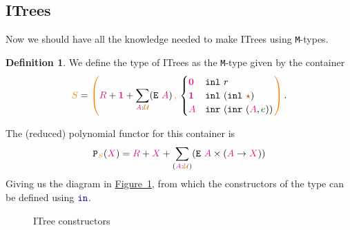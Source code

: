 \documentclass[twoside,11pt,openright]{report}
\theoremstyle{plain} %
\theoremstyle{definition}
\newtheorem{defn}[thm]{Definition}%
\theoremstyle{remark}
\newcommand*{\figref}[1]{\hyperref[fig:#1]{Figure~\ref*{fig:#1}}}
\newcommand*{\term}[1]{\textcolor{green!30!black}{#1}} %
\newcommand*{\type}[1]{\textcolor{magenta!90!black}{#1}}
\newcommand*{\container}[1]{\textcolor{orange}{#1}}
\newcommand*{\containerpair}[2]{\ensuremath{\colorlet{savedleftcolor}{.}\color{orange}\left(\color{savedleftcolor}#1\,\textcolor{orange}{\mathbf{,}}\,#2\color{orange}\right)\color{savedleftcolor}}}
\newcommand*{\universe}[1]{\textcolor{orange!80!black}{#1}}
\newcommand*{\unit}{\type{\textbf{1}}}
\newcommand*{\empt}{\type{\textbf{0}}}
\newcommand*{\constant}[1]{\textcolor{orange!60!black}{\ensuremath{\mathtt{#1}}}}
\newcommand*{\function}[1]{\textcolor{blue!60!black}{\ensuremath{\mathtt{#1}}}}
\newcommand*{\constructor}[1]{\textcolor{purple!60!black}{\ensuremath{\mathtt{#1}}}}
\newcommand*{\typeformer}[1]{\ensuremath{\mathtt{#1}}}
\newcommand*{\functor}[1]{\ensuremath{\mathbf{\mathtt{#1}}}}
\newcommand*{\unitelem}{\constant{\star}} %
\begin{document}
\subsection{ITrees}
Now we should have all the knowledge needed to make ITrees using \texttt{M}-types.
\begin{defn}
  We define the type of ITrees as the \texttt{M}-type given by the container
  \begin{equation}
    \container{S} = \containerpair{\type{R}+\unit+\sum_{\type{A}:\universe{\mathcal{U}}} (\typeformer{E}~\type{A})}{\begin{cases} \empt & \texttt{inl}~r \\ \unit & \texttt{inl}~(\texttt{inl}~\unitelem) \\ \type{A} & \texttt{inr}~(\texttt{inr}~(\type{A},\term{e})) \end{cases}}.
  \end{equation}
\end{defn}
\noindent The (reduced) polynomial functor for this container is
\begin{equation}
  \functor{P}_{\container{S}}(\type{X}) = \type{R} + \type{X} + \sum_{(\type{A} : \universe{\mathcal{U}})} (\typeformer{E}~\type{A} \times (\type{A} \rightarrow \type{X}))
\end{equation}
Giving us the diagram in \figref{ITree-constructors}, from which the constructors of the type can be defined using \(\function{in}\).
\begin{figure}[h]
  \centering
  \caption{ITree constructors}
  \label{fig:ITree-constructors}
\end{figure}
\end{document}
